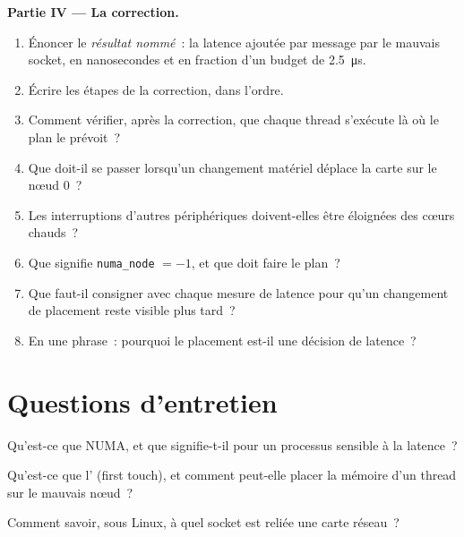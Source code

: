 \begin{problem}
\medskip\noindent\textbf{Partie IV --- La correction.}
\begin{enumerate}[resume]
\item Énoncer le \emph{résultat nommé}~: la latence ajoutée par message par le mauvais socket, en nanosecondes et en fraction
d'un budget de \qty{2.5}{\micro\second}.
\item Écrire les étapes de la correction, dans l'ordre.
\item Comment vérifier, après la correction, que chaque thread s'exécute là où le plan le prévoit~?
\item Que doit-il se passer lorsqu'un changement matériel déplace la carte sur le nœud 0~?
\item Les interruptions d'autres périphériques doivent-elles être éloignées des cœurs chauds~?
\item Que signifie \texttt{numa\_node} $= -1$, et que doit faire le plan~?
\item Que faut-il consigner avec chaque mesure de latence pour qu'un changement de placement reste visible plus tard~?
\item En une phrase~: pourquoi le placement est-il une décision de latence~?
\end{enumerate}
\end{problem}

\section{Questions d'entretien}

\begin{interviewq}\label{iq:ll:multi-socket-machines-and-interconnects:1}
Qu'est-ce que NUMA, et que signifie-t-il pour un processus sensible à la latence~?
\end{interviewq}

\begin{interviewq}\label{iq:ll:multi-socket-machines-and-interconnects:2}
Qu'est-ce que l' (first touch), et comment peut-elle placer la mémoire d'un thread sur le mauvais nœud~?
\end{interviewq}

\begin{interviewq}\label{iq:ll:multi-socket-machines-and-interconnects:3}
Comment savoir, sous Linux, à quel socket est reliée une carte réseau~?
\end{interviewq}

